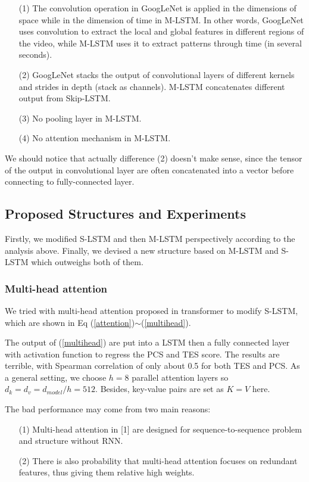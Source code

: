 \documentclass{article}
\begin{document}
\begin{itemize}
\item[(1)] The convolution operation in GoogLeNet is applied in the dimensions of space while in the dimension of time in M-LSTM. In other words, GoogLeNet uses convolution to extract the local and global features in different regions of the video, while M-LSTM uses it to extract patterns through time (in several seconds).
\item[(2)] GoogLeNet stacks the output of convolutional layers of different kernels and strides in depth (stack as channels). M-LSTM concatenates different output from Skip-LSTM.
\item[(3)] No pooling layer in M-LSTM.
\item[(4)] No attention mechanism in M-LSTM.
\end{itemize}

We should notice that actually difference (2) doesn't make sense, since the tensor of the output in convolutional layer are often concatenated into a vector before connecting to fully-connected layer.

\subsection{Proposed Structures and Experiments}
\label{structure}
Firstly, we modified S-LSTM and then M-LSTM perspectively according to the analysis above. Finally, we devised a new structure based on M-LSTM and S-LSTM which outweighs both of them.
\subsubsection{Multi-head attention}
We tried with multi-head attention proposed in transformer to modify S-LSTM, which are shown in Eq (\ref{attention})$\sim$(\ref{multihead}).

The output of (\ref{multihead}) are put into a LSTM then a fully connected layer with activation function to regress the PCS and TES score.
The results are terrible, with Spearman correlation of only about 0.5 for both TES and PCS. As a general setting, we choose $h=8$ parallel attention layers so $d_k=d_v=d_{model}/h=512$. Besides, key-value pairs are set as $K=V$ here.\par
The bad performance may come from two main reasons:

\begin{itemize}
\item[(1)] Multi-head attention in [1] are designed for sequence-to-sequence problem and structure without RNN.
\item[(2)] There is also probability that multi-head attention focuses on redundant features, thus giving them relative high weights.
\end{itemize}
\end{document}
